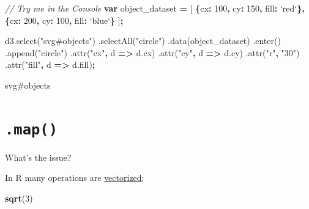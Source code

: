 \documentclass[openany]{book}
\newenvironment{Shaded}{\begin{snugshade}}{\end{snugshade}}
\newcommand{\AttributeTok}[1]{\textcolor[rgb]{0.77,0.63,0.00}{#1}}
\newcommand{\CommentTok}[1]{\textcolor[rgb]{0.56,0.35,0.01}{\textit{#1}}}
\newcommand{\DataTypeTok}[1]{\textcolor[rgb]{0.13,0.29,0.53}{#1}}
\newcommand{\DecValTok}[1]{\textcolor[rgb]{0.00,0.00,0.81}{#1}}
\newcommand{\KeywordTok}[1]{\textcolor[rgb]{0.13,0.29,0.53}{\textbf{#1}}}
\newcommand{\NormalTok}[1]{#1}
\newcommand{\OperatorTok}[1]{\textcolor[rgb]{0.81,0.36,0.00}{\textbf{#1}}}
\newcommand{\StringTok}[1]{\textcolor[rgb]{0.31,0.60,0.02}{#1}}
\newcommand{\VariableTok}[1]{\textcolor[rgb]{0.00,0.00,0.00}{#1}}
\newcommand{\VerbatimStringTok}[1]{\textcolor[rgb]{0.31,0.60,0.02}{#1}}
\begin{document}
\begin{Shaded}
\begin{Highlighting}[]
\CommentTok{// Try me in the Console}
\KeywordTok{var}\NormalTok{ object_dataset }\OperatorTok{=}\NormalTok{ [}
  \OperatorTok{\{}\DataTypeTok{cx}\OperatorTok{:} \DecValTok{100}\OperatorTok{,} \DataTypeTok{cy}\OperatorTok{:} \DecValTok{150}\OperatorTok{,} \DataTypeTok{fill}\OperatorTok{:} \VerbatimStringTok{`red`}\OperatorTok{\},}
  \OperatorTok{\{}\DataTypeTok{cx}\OperatorTok{:} \DecValTok{200}\OperatorTok{,} \DataTypeTok{cy}\OperatorTok{:} \DecValTok{100}\OperatorTok{,} \DataTypeTok{fill}\OperatorTok{:} \VerbatimStringTok{`blue`}\OperatorTok{\}}
\NormalTok{  ]}\OperatorTok{;}

\VariableTok{d3}\NormalTok{.}\AttributeTok{select}\NormalTok{(}\StringTok{"svg#objects"}\NormalTok{)}
\NormalTok{  .}\AttributeTok{selectAll}\NormalTok{(}\StringTok{"circle"}\NormalTok{)}
\NormalTok{  .}\AttributeTok{data}\NormalTok{(object_dataset)}
\NormalTok{  .}\AttributeTok{enter}\NormalTok{()}
\NormalTok{  .}\AttributeTok{append}\NormalTok{(}\StringTok{"circle"}\NormalTok{)}
\NormalTok{    .}\AttributeTok{attr}\NormalTok{(}\StringTok{"cx"}\OperatorTok{,}\NormalTok{ d }\OperatorTok{=>} \VariableTok{d}\NormalTok{.}\AttributeTok{cx}\NormalTok{)}
\NormalTok{    .}\AttributeTok{attr}\NormalTok{(}\StringTok{"cy"}\OperatorTok{,}\NormalTok{ d }\OperatorTok{=>} \VariableTok{d}\NormalTok{.}\AttributeTok{cy}\NormalTok{)}
\NormalTok{    .}\AttributeTok{attr}\NormalTok{(}\StringTok{"r"}\OperatorTok{,} \StringTok{"30"}\NormalTok{)}
\NormalTok{    .}\AttributeTok{attr}\NormalTok{(}\StringTok{"fill"}\OperatorTok{,}\NormalTok{ d }\OperatorTok{=>} \VariableTok{d}\NormalTok{.}\AttributeTok{fill}\NormalTok{)}\OperatorTok{;}
\end{Highlighting}
\end{Shaded}

svg\#objects

\hypertarget{map}{%
\section{\texorpdfstring{\texttt{.map()}}{.map()}}\label{map}}

What's the issue?

In R many operations are \href{https://bookdown.org/rdpeng/rprogdatascience/vectorized-operations.html}{vectorized}:

\begin{Shaded}
\begin{Highlighting}[]
\KeywordTok{sqrt}\NormalTok{(}\DecValTok{3}\NormalTok{)}
\end{Highlighting}
\end{Shaded}
\end{document}
